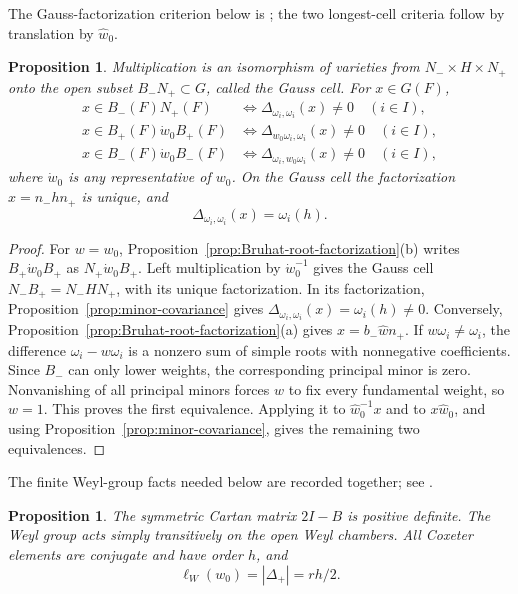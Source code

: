 \documentclass[11pt,leqno]{amsart}
\numberwithin{equation}{section}
\theoremstyle{plain}
\newtheorem{proposition}[theorem]{Proposition}
\theoremstyle{definition}
\theoremstyle{plain}
\theoremstyle{definition}
\theoremstyle{remark}
\begin{document}
The Gauss-factorization criterion below is \cite[Corollary~2.5]{FominZelevinsky1999}; the two longest-cell criteria follow by translation by $\widehat w_0$.
\begin{proposition}\label{prop:Gauss-minor-criteria}
Multiplication is an isomorphism of varieties from $N_-\times H\times N_+$ onto the open subset $B_-N_+\subset G$, called the \emph{Gauss cell}.  For $x\in G(F)$,
\begin{align*}
 x\in B_-(F)N_+(F)
 &\Longleftrightarrow
 \Delta_{\omega_i,\omega_i}(x)\ne0\quad(i\in I),\\
 x\in B_+(F)\dot w_0B_+(F)
 &\Longleftrightarrow
 \Delta_{w_0\omega_i,\omega_i}(x)\ne0\quad(i\in I),\\
 x\in B_-(F)\dot w_0B_-(F)
 &\Longleftrightarrow
 \Delta_{\omega_i,w_0\omega_i}(x)\ne0\quad(i\in I),
\end{align*}
where $\dot w_0$ is any representative of $w_0$.  On the Gauss cell the factorization $x=n_-hn_+$ is unique, and
\[
 \Delta_{\omega_i,\omega_i}(x)=\omega_i(h).
\]
\end{proposition}
\begin{proof}
For $w=w_0$, Proposition~\ref{prop:Bruhat-root-factorization}(b) writes $B_+\dot w_0B_+$ as $N_+\dot w_0B_+$.  Left multiplication by $\dot w_0^{-1}$ gives the Gauss cell $N_-B_+=N_-HN_+$, with its unique factorization.  In its factorization, Proposition~\ref{prop:minor-covariance} gives $\Delta_{\omega_i,\omega_i}(x)=\omega_i(h)\ne0$.  Conversely, Proposition~\ref{prop:Bruhat-root-factorization}(a) gives $x=b_-\widehat w n_+$.  If $w\omega_i\ne\omega_i$, the difference $\omega_i-w\omega_i$ is a nonzero sum of simple roots with nonnegative coefficients.  Since $B_-$ can only lower weights, the corresponding principal minor is zero.  Nonvanishing of all principal minors forces $w$ to fix every fundamental weight, so $w=1$.  This proves the first equivalence.  Applying it to $\widehat w_0^{-1}x$ and to $x\widehat w_0$, and using Proposition~\ref{prop:minor-covariance}, gives the remaining two equivalences.
\end{proof}

The finite Weyl-group facts needed below are recorded together; see
\cite[Chapters~1 and~3]{Humphreys1990}.
\begin{proposition}\label{prop:finite-Weyl-data}
The symmetric Cartan matrix $2I-B$ is positive definite.  The Weyl group
acts simply transitively on the open Weyl chambers.  All Coxeter elements
are conjugate and have order $h$, and
\[
 \ell_W(w_0)=|\Delta_+|=rh/2.
\]
\end{proposition}
\end{document}
